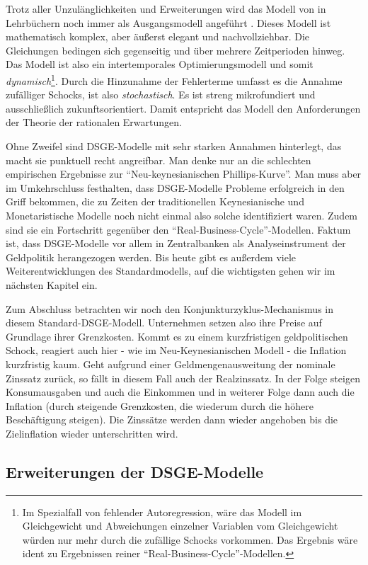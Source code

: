 Trotz aller Unzulänglichkeiten und Erweiterungen wird das Modell von \textcite{Gali2000} in Lehrbüchern noch immer als Ausgangsmodell angeführt \parencite[S. 350]{Romer2019}. Dieses Modell ist mathematisch komplex, aber äußerst elegant und nachvollziehbar. Die Gleichungen bedingen sich gegenseitig und über mehrere Zeitperioden hinweg. Das Modell ist also ein intertemporales Optimierungsmodell und somit \textit{dynamisch}\footnote{Im Spezialfall von fehlender Autoregression, wäre das Modell im Gleichgewicht und Abweichungen einzelner Variablen vom Gleichgewicht würden nur mehr durch die zufällige Schocks vorkommen. Das Ergebnis wäre ident zu Ergebnissen reiner "`Real-Business-Cycle"'-Modellen.}. Durch die Hinzunahme der Fehlerterme umfasst es die Annahme zufälliger Schocks, ist also \textit{stochastisch}. Es ist streng mikrofundiert und ausschließlich zukunftsorientiert. Damit entspricht das Modell den Anforderungen der Theorie der rationalen Erwartungen.

Ohne Zweifel sind DSGE-Modelle mit sehr starken Annahmen hinterlegt, das macht sie punktuell recht angreifbar. Man denke nur an die schlechten empirischen Ergebnisse zur "`Neu-keynesianischen Phillips-Kurve"'. Man muss aber im Umkehrschluss festhalten, dass DSGE-Modelle Probleme erfolgreich in den Griff bekommen, die zu Zeiten der traditionellen Keynesianische und Monetaristische Modelle noch nicht einmal also solche identifiziert waren. Zudem sind sie ein Fortschritt gegenüber den "`Real-Business-Cycle"'-Modellen. Faktum ist, dass DSGE-Modelle vor allem in Zentralbanken als Analyseinstrument der Geldpolitik herangezogen werden. Bis heute gibt es außerdem viele Weiterentwicklungen des Standardmodells, auf die wichtigsten gehen wir im nächsten Kapitel ein.

Zum Abschluss betrachten wir noch den Konjunkturzyklus-Mechanismus in diesem Standard-DSGE-Modell. Unternehmen setzen also ihre Preise auf Grundlage ihrer Grenzkosten. Kommt es zu einem kurzfristigen geldpolitischen Schock, reagiert auch hier - wie im Neu-Keynesianischen Modell - die Inflation kurzfristig kaum. Geht aufgrund einer Geldmengenausweitung der nominale Zinssatz zurück, so fällt in diesem Fall auch der Realzinssatz. In der Folge steigen Konsumausgaben und auch die Einkommen und in weiterer Folge dann auch die Inflation (durch steigende Grenzkosten, die wiederum durch die höhere Beschäftigung steigen). Die Zinssätze werden dann wieder angehoben bis die Zielinflation wieder unterschritten wird. 

\subsection{Erweiterungen der DSGE-Modelle}
\label{ErweiterungDSGE}

